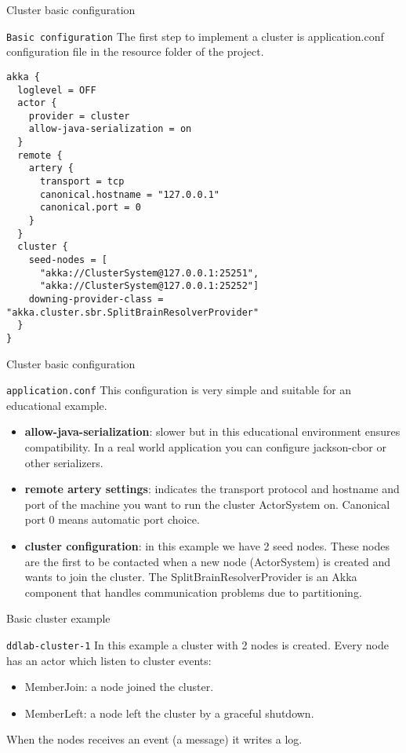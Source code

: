 \documentclass[presentation,apice]{beamer}\mode<presentation>{\usetheme{AMSBolognaFC}}
\begin{document}
\begin{frame}[c,fragile]{Cluster basic configuration}
%
\begin{block}{\texttt{Basic configuration}}
The first step to implement a cluster is application.conf configuration file in the resource folder of the project.
\begin{lstlisting}
akka {
  loglevel = OFF
  actor {
    provider = cluster
    allow-java-serialization = on
  }
  remote {
    artery {
      transport = tcp
      canonical.hostname = "127.0.0.1"
      canonical.port = 0
    }
  }
  cluster {
    seed-nodes = [
      "akka://ClusterSystem@127.0.0.1:25251",
      "akka://ClusterSystem@127.0.0.1:25252"]
    downing-provider-class = "akka.cluster.sbr.SplitBrainResolverProvider"
  }
}
\end{lstlisting}
\end{block}
\end{frame}

\begin{frame}{Cluster basic configuration}    
\begin{block}{\texttt{application.conf}}
This configuration is very simple and suitable for an educational example.
\begin{itemize}
\item \textbf{allow-java-serialization}: slower but in this educational environment ensures compatibility. In a real world application you can configure jackson-cbor or other serializers.
\item \textbf{remote artery settings}: indicates the transport protocol and hostname and port of the machine you want to run the cluster ActorSystem on. Canonical port 0 means automatic port choice.
\item \textbf{cluster configuration}: in this example we have 2 seed nodes. These nodes are the first to be contacted when a new node (ActorSystem) is created and wants to join the cluster. The SplitBrainResolverProvider is an Akka component that handles communication problems due to partitioning.
\end{itemize}
\end{block}
%
\end{frame}
\begin{frame}{Basic cluster example}    
\begin{block}{\texttt{ddlab-cluster-1}}
In this example a cluster with 2 nodes is created. Every node has an actor which listen to cluster events: 
\begin{itemize}
    \item MemberJoin: a node joined the cluster.
    \item MemberLeft: a node left the cluster by a graceful shutdown.
\end{itemize}
When the nodes receives an event (a message) it writes a log.
\end{block}
%
\end{frame}
\end{document}
